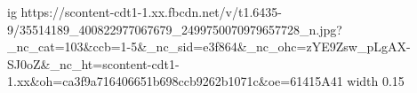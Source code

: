  
 
 
 
 

\par
\ifcmt
  ig https://scontent-cdt1-1.xx.fbcdn.net/v/t1.6435-9/35514189_400822977067679_2499750070979657728_n.jpg?_nc_cat=103&ccb=1-5&_nc_sid=e3f864&_nc_ohc=zYE9Zsw_pLgAX-SJ0oZ&_nc_ht=scontent-cdt1-1.xx&oh=ca3f9a716406651b698ccb9262b1071c&oe=61415A41
  width 0.15
\fi
